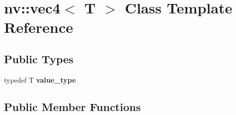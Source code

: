 \hypertarget{classnv_1_1vec4}{}\section{nv\+:\+:vec4$<$ T $>$ Class Template Reference}
\label{classnv_1_1vec4}
\subsection*{Public Types}
\begin{DoxyCompactItemize}
\item 
\hypertarget{classnv_1_1vec4_a09fb8b95c9c02056c65620ea2fba281b}{}\label{classnv_1_1vec4_a09fb8b95c9c02056c65620ea2fba281b} 
typedef T {\bfseries value\+\_\+type}
\end{DoxyCompactItemize}
\subsection*{Public Member Functions}
